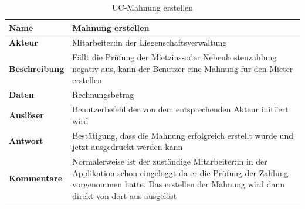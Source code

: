 \begin{table}[H]
  \centering
  \settowidth{}
  \setlength\extrarowheight{2pt}
  \begin{tabulary}{1.0\textwidth}{|a|m{14cm}|}
    \hline
    \textbf{Name}& Mahnung erstellen\\
    \hline
    \textbf{Akteur}& Mitarbeiter:in der Liegenschaftsverwaltung\\
    \hline 
    \textbf{Beschreibung} & Fällt die Prüfung der Mietzins-oder Nebenkostenzahlung negativ aus, kann der Benutzer eine Mahnung für den Mieter erstellen \\
    \hline
    \textbf{Daten} & Rechnungsbetrag\\
    \hline
    \textbf{Auslöser} & Benutzerbefehl der von dem entsprechenden Akteur initiiert wird\\
    \hline
    \textbf{Antwort} & Bestätigung, dass die Mahnung erfolgreich erstellt wurde und jetzt ausgedruckt werden kann\\
    \hline
    \textbf{Kommentare} & Normalerweise ist der zuständige Mitarbeiter:in in der Applikation schon eingeloggt da er die Prüfung der Zahlung vorgenommen hatte. Das erstellen der Mahnung wird dann direkt von dort aus ausgelöst\\
    \hline
  \end{tabulary}
  \caption{UC-Mahnung erstellen}
\end{table}

